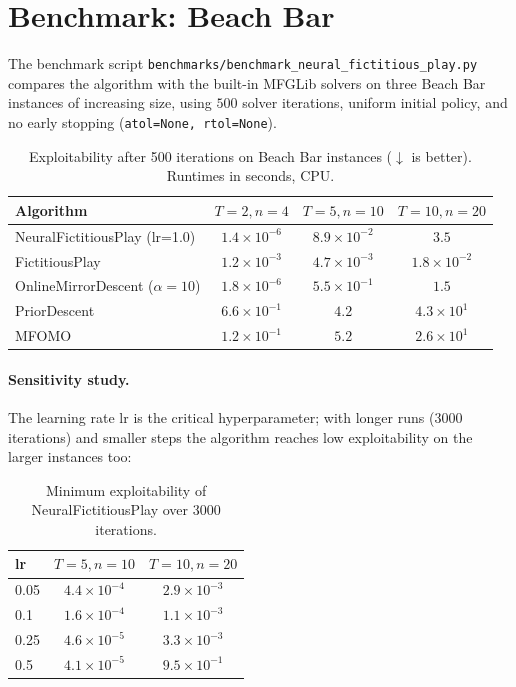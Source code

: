 \documentclass[11pt,a4paper]{article}
\begin{document}
\section{Benchmark: Beach Bar}\label{sec:bench}

The benchmark script \texttt{benchmarks/benchmark\_neural\_fictitious\_play.py}
compares the algorithm with the built-in MFGLib solvers on three Beach Bar
instances \cite{perrin2020} of increasing size, using $500$ solver iterations,
uniform initial policy, and no early stopping
(\texttt{atol=None, rtol=None}).

\begin{table}[h]
\centering
\caption{Exploitability after 500 iterations on Beach Bar instances
($\downarrow$ is better). Runtimes in seconds, CPU.}
\begin{tabular}{lccc}
\toprule
Algorithm & $T{=}2, n{=}4$ & $T{=}5, n{=}10$ & $T{=}10, n{=}20$ \\
\midrule
NeuralFictitiousPlay (lr=1.0) & $1.4 \times 10^{-6}$ & $8.9 \times 10^{-2}$ & $3.5$ \\
FictitiousPlay               & $1.2 \times 10^{-3}$ & $4.7 \times 10^{-3}$ & $1.8 \times 10^{-2}$ \\
OnlineMirrorDescent ($\alpha{=}10$) & $1.8 \times 10^{-6}$ & $5.5 \times 10^{-1}$ & $1.5$ \\
PriorDescent                 & $6.6 \times 10^{-1}$ & $4.2$ & $4.3 \times 10^{1}$ \\
MFOMO                        & $1.2 \times 10^{-1}$ & $5.2$ & $2.6 \times 10^{1}$ \\
\bottomrule
\end{tabular}
\end{table}

\paragraph{Sensitivity study.} The learning rate $\mathrm{lr}$ is the critical
hyperparameter; with longer runs ($3000$ iterations) and smaller steps the
algorithm reaches low exploitability on the larger instances too:

\begin{table}[h]
\centering
\caption{Minimum exploitability of NeuralFictitiousPlay over 3000 iterations.}
\begin{tabular}{lcc}
\toprule
lr & $T{=}5, n{=}10$ & $T{=}10, n{=}20$ \\
\midrule
0.05 & $4.4 \times 10^{-4}$ & $2.9 \times 10^{-3}$ \\
0.1  & $1.6 \times 10^{-4}$ & $1.1 \times 10^{-3}$ \\
0.25 & $4.6 \times 10^{-5}$ & $3.3 \times 10^{-3}$ \\
0.5  & $4.1 \times 10^{-5}$ & $9.5 \times 10^{-1}$ \\
\bottomrule
\end{tabular}
\end{table}
\end{document}
